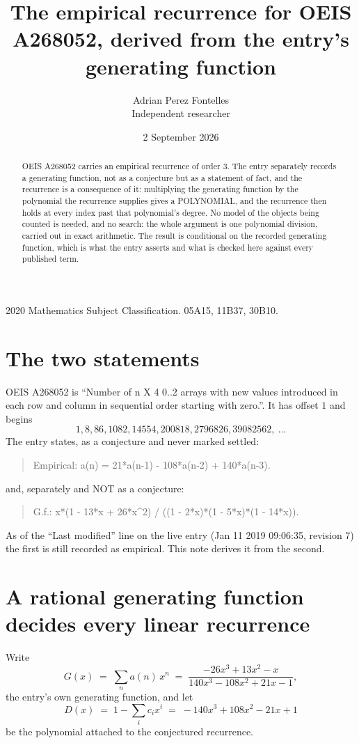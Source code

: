 \documentclass[11pt,a4paper]{article}
\title{The empirical recurrence for OEIS A268052, derived from the entry's generating function}
\author{Adrian Perez Fontelles\\ \small Independent researcher}
\date{2 September 2026}
\theoremstyle{plain}
\theoremstyle{definition}
\begin{document}
\maketitle

\begin{abstract}
OEIS A268052 carries an empirical recurrence of order $3$. The entry separately records a
generating function, not as a conjecture but as a statement of fact, and the recurrence is a
consequence of it: multiplying the generating function by the polynomial the recurrence
supplies gives a POLYNOMIAL, and the recurrence then holds at every index past that
polynomial's degree. No model of the objects being counted is needed, and no search: the
whole argument is one polynomial division, carried out in exact arithmetic. The result is
conditional on the recorded generating function, which is what the entry asserts and what is
checked here against every published term.
\end{abstract}

\noindent\small 2020 Mathematics Subject Classification. 05A15, 11B37, 30B10.\normalsize

\section{The two statements}

OEIS A268052 is ``Number of n X 4 0..2 arrays with new values introduced in each row and column in sequential order starting with zero.''. It has offset $1$ and begins
\[
1, 8, 86, 1082, 14554, 200818, 2796826, 39082562,\ \dots
\]
The entry states, as a conjecture and never marked settled:
\begin{quote}
Empirical: a(n) = 21*a(n-1) - 108*a(n-2) + 140*a(n-3).
\end{quote}
and, separately and NOT as a conjecture:
\begin{quote}
G.f.: x*(1 - 13*x + 26*x\^{}2) / ((1 - 2*x)*(1 - 5*x)*(1 - 14*x)).
\end{quote}
As of the ``Last modified'' line on the live entry (Jan 11 2019 09:06:35, revision 7) the first is still
recorded as empirical. This note derives it from the second.

\section{A rational generating function decides every linear recurrence}

Write
\[
G(x)\;=\;\sum_{n}a(n)\,x^{n}\;=\;\frac{- 26 x^{3} + 13 x^{2} - x}{140 x^{3} - 108 x^{2} + 21 x - 1},
\]
the entry's own generating function, and let
\[
D(x)\;=\;1-\sum_i c_i x^{i}\;=\;- 140 x^{3} + 108 x^{2} - 21 x + 1
\]
be the polynomial attached to the conjectured recurrence.
\end{document}
